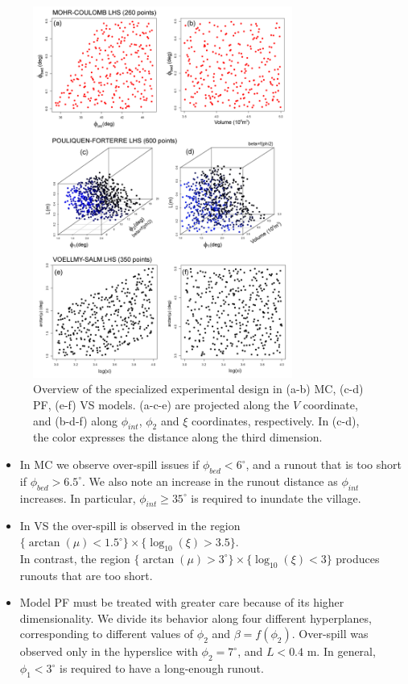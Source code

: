 \documentclass[nhess, manuscript]{copernicus}
\begin{document}
\begin{figure}[H]
\centering
\includegraphics[width=0.76\textwidth]{Fig2.png}
\caption{Overview of the specialized experimental design in (a-b) MC, (c-d) PF, (e-f) VS models. (a-c-e) are projected along the $V$ coordinate, and (b-d-f) along $\phi_{int}$, $\phi_2$ and $\xi$ coordinates, respectively. In (c-d), the color expresses the distance along the third dimension.}
\label{Fig2}
\end{figure}

\begin{itemize}
\item In MC we observe over-spill issues if $\phi_{bed} < 6^\circ$, and a  runout that is too short if $\phi_{bed} > 6.5^\circ$. We also note an increase in the runout distance as $\phi_{int}$ increases. In particular, $\phi_{int} \ge 35^\circ$ is required to inundate the village.
\item In VS the over-spill is observed in the region $\{\arctan(\mu)<1.5^\circ\} \times \{\log_{10}(\xi)>3.5\}$. \\In contrast, the region $\{\arctan(\mu)>3^\circ\} \times \{\log_{10}(\xi)<3\}$ produces runouts that are too short.
\item Model PF must be treated with greater care because of its higher dimensionality. We divide its behavior along four different hyperplanes, corresponding to different values of $\phi_2$ and $\beta=f(\phi_2)$. Over-spill was observed only in the hyperslice with $\phi_2=7^\circ$, and $L<0.4$ m. In general, $\phi_1<3^\circ$ is required to have a long-enough runout.
\end{itemize}
\end{document}
